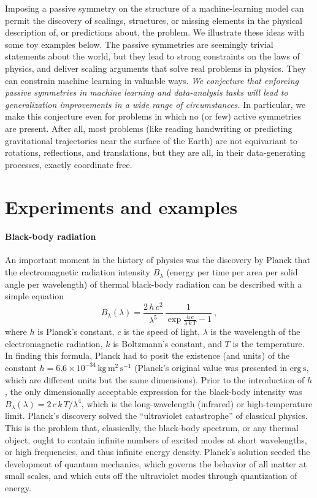 \documentclass{article}
\theoremstyle{plain}
\theoremstyle{definition}
\theoremstyle{remark}
\newcommand{\unit}[1]{\mathrm{#1}}
\newcommand{\kg}{\unit{kg}}
\newcommand{\m}{\unit{m}}
\newcommand{\s}{\unit{s}}
\begin{document}
Imposing a passive symmetry on the structure of a machine-learning model can permit the discovery of scalings, structures, or missing elements in the physical description of, or predictions about, the problem.
We illustrate these ideas with some toy examples below.
The passive symmetries are seemingly trivial statements about the world, but they lead to strong constraints on the laws of physics, and deliver scaling arguments that solve real problems in physics.
They can constrain machine learning in valuable ways.
\emph{We conjecture that enforcing passive symmetries in machine learning and data-analysis tasks will lead to generalization improvements in a wide range of circumstances.}
In particular, we make this conjecture even for problems in which no (or few) active symmetries are present.
After all, most problems (like reading handwriting or predicting gravitational trajectories near the surface of the Earth) are not equivariant to rotations, reflections, and translations, but they are all, in their data-generating processes, exactly coordinate free.

\section{Experiments and examples}\label{sec:experiments}

\paragraph{Black-body radiation}
An important moment in the history of physics was the discovery by Planck that the electromagnetic radiation intensity $B_\lambda$ (energy per time per area per solid angle per wavelength) of thermal black-body radiation can be described with a simple equation \cite{planck}
\begin{equation}
    B_\lambda(\lambda) = \frac{2\,h\,c^2}{\lambda^5}\,\frac{1}{\exp\frac{h\,c}{\lambda\,k\,T} - 1}~,
\end{equation}
where $h$ is Planck's constant,
$c$ is the speed of light,
$\lambda$ is the wavelength of the electromagnetic radiation,
$k$ is Boltzmann's constant,
and $T$ is the temperature.
In finding this formula, Planck had to posit the existence (and units) of the constant $h=6.6\times 10^{-34}\,\kg\,\m^2\,\s^{-1}$ (Planck's original value was presented in $\mathrm{erg}\,\s$, which are different units but the same dimensions).
Prior to the introduction of $h$, the only dimensionally acceptable expression for the black-body intensity was $B_\lambda(\lambda)=2\,c\,k\,T/\lambda^4$, which is the long-wavelength (infrared) or high-temperature limit.
Planck's discovery solved the ``ultraviolet catastrophe'' of classical physics.
This is the problem that, classically, the black-body spectrum, or any thermal object, ought to contain infinite numbers of excited modes at short wavelengths, or high frequencies, and thus infinite energy density.
Planck's solution seeded the development of quantum mechanics, which governs the behavior of all matter at small scales, and which cuts off the ultraviolet modes through quantization of energy.
\end{document}
